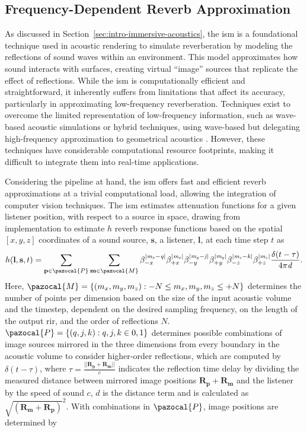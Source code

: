 \subsection{Frequency-Dependent Reverb Approximation}
As discussed in Section~\ref{sec:intro-immersive-acoustics}, the \acrfull{ism} is a foundational technique used in acoustic rendering to simulate reverberation by modeling the reflections of sound waves within an environment. This model approximates how sound interacts with surfaces, creating virtual ``image'' sources that replicate the effect of reflections. While the \acrshort{ism} is computationally efficient and straightforward, it inherently suffers from limitations that affect its accuracy, particularly in approximating low-frequency reverberation. Techniques exist to overcome the limited representation of low-frequency information, such as wave-based acoustic simulations \citep{hamilton2017fdtd} or hybrid techniques, using wave-based but delegating high-frequency approximation to geometrical acoustics \citep{southern2013room}. However, these techniques have considerable computational resource footprints, making it difficult to integrate them into real-time applications.\par
Considering the pipeline at hand, the \acrshort{ism} offers fast and efficient reverb approximations at a trivial computational load, allowing the integration of computer vision techniques. The \acrshort{ism} estimates attenuation functions for a given listener position, with respect to a source in space, drawing from~\cite{habets2006room} implementation to estimate $h$ reverb response functions based on the spatial $[x, y, z]$ coordinates of a sound source, $\mathbf{s}$, a listener, $\mathbf{l}$, at each time step $t$ as 
\begin{equation}\label{eq:ism-base}
    h(\mathbf{l}, \mathbf{s}, t) = \sum_{\mathbf{p} \in \pazocal{P}} \sum_{\mathbf{m} \in \pazocal{M}} \beta_{-x}^{|\mathit{m_x - q}|} \beta_{+x}^{|\mathit{m_x}|} \beta_{-y}^{|\mathit{m_y - j}|} \beta_{+y}^{|\mathit{m_y}|} \beta_{-z}^{|\mathit{m_z - k}|}  \beta_{+z}^{|\mathit{m_z}|} \frac{\delta(t - \tau)}{4\pi \mathit{d}}\textrm{.}
\end{equation}
Here, $\pazocal{M} = \{(m_x, m_y, m_z): -N \leq m_x, m_y, m_z \leq +N\}$ determines the number of points per dimension based on the size of the input acoustic volume and the timestep, dependent on the desired sampling frequency, on the length of the output \acrshort{rir}, and the order of reflections $N$. $\pazocal{P} = \{ (q, j, k): q, j, k \in {0, 1} \}$ determines possible combinations of image sources mirrored in the three dimensions from every boundary in the acoustic volume to consider higher-order reflections, which are computed by $\delta (t - \tau)$, where $\tau = \frac{||\mathbf{R_p} + \mathbf{R_m}||}{c}$ indicates the reflection time delay by dividing the measured distance between mirrored image positions $\mathbf{R_p} + \mathbf{R_m}$ and the listener by the speed of sound $c$, $d$ is the distance term and is calculated as $\sqrt{(\mathbf{R_m}+\mathbf{R_p})}^2$. With combinations in $\pazocal{P}$, image positions are determined by
